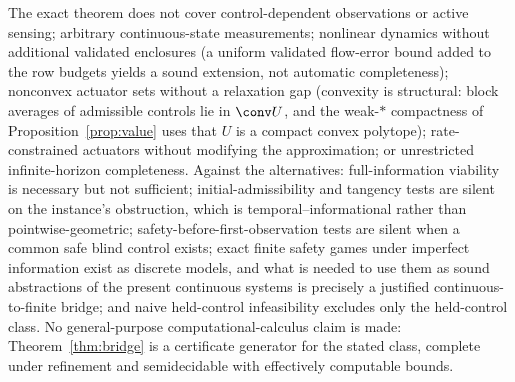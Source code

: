 The exact theorem does not cover control-dependent observations or active sensing; arbitrary continuous-state measurements; nonlinear dynamics without additional validated enclosures (a uniform validated flow-error bound added to the row budgets yields a sound extension, not automatic completeness); nonconvex actuator sets without a relaxation gap (convexity is structural: block averages of admissible controls lie in $\conv U$, and the weak-$\ast$ compactness of Proposition~\ref{prop:value} uses that $U$ is a compact convex polytope); rate-constrained actuators without modifying the approximation; or unrestricted infinite-horizon completeness. Against the alternatives: full-information viability is necessary but not sufficient; initial-admissibility and tangency tests are silent on the instance's obstruction, which is temporal--informational rather than pointwise-geometric; safety-before-first-observation tests are silent when a common safe blind control exists; exact finite safety games under imperfect information \cite{Chatterjee2007} exist as discrete models, and what is needed to use them as sound abstractions of the present continuous systems is precisely a justified continuous-to-finite bridge; and naive held-control infeasibility excludes only the held-control class. No general-purpose computational-calculus claim is made: Theorem~\ref{thm:bridge} is a certificate generator for the stated class, complete under refinement and semidecidable with effectively computable bounds.
